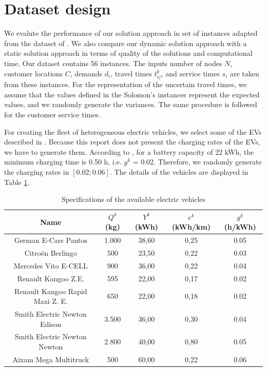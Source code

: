\documentclass[11pt]{article}
\begin{document}
\section{Dataset design}
\label{section:dataset}
We evalute the performance of our solution approach in set of instances adapted from the dataset of \cite{Solomon1987}. We also compare our dynamic solution approach with a static solution approach in terms of quality of the solutions and computational time. Our dataset contains 56 instances. The inputs number of nodes $N$, customer locations $C$, demands $d_i$, travel times $t^k_{ij}$, and service times $s_i$ are taken from these instances. For the representation of the uncertain travel times, we assume that the values defined in the Solomon's instances represent the expected values, and we randomly generate the variances. The same procedure is followed for the customer service times. 

For creating the fleet of heterogeneous electric vehicles, we select some of the EVs described in \cite{mobility2013}. Because this report does not present the charging rates of the EVs, we have to generate them. According to \citep{Montoya2017}, for a battery capacity of 22 kWh, the minimum charging time is 0.50 h, i.e. $g^k$ = 0.02. Therefore, we randomly generate the charging rates in $[0.02;0.06]$. The details of the vehicles are displayed in Table \ref{table:vehicles}.

\begin{table}[H]
	\begin{center}
	\begin{tabular}{c c c c c}
	\toprule
	Name & $Q^k$ (kg) &  $Y^k$ (kWh) & $e^k$ (kWh/km) & $g^k$ (h/kWh)\\ \midrule
	German E-Cars Pantos & 1.000 & 38,60  & 0,25 & 0.05\\
	Citro\"{e}n Berlingo &500 &23,50 &0,22 & 0.03 \\
	Mercedes Vito E-CELL & 900 & 36,00& 0,22 & 0.04\\
	Renault Kangoo Z.E. & 595 & 22,00 & 0,17 & 0.02 \\
	Renault Kangoo Rapid Maxi Z. E. & 650  & 22,00 & 0,18 & 0.02 \\
	Smith Electric Newton Edison & 3.500 & 36,00 & 0,30 & 0.04\\
	Smith Electric Newton Newton & 2.800 & 40,00 & 0,80 & 0.05 \\
	Aixam Mega Multitruck & 500 & 60,00 & 0,22 & 0.06\\
	\bottomrule
	\end{tabular}
	\end{center}
\caption{Specifications of the available electric vehicles}
\label{table:vehicles}
\end{table}
\end{document}
